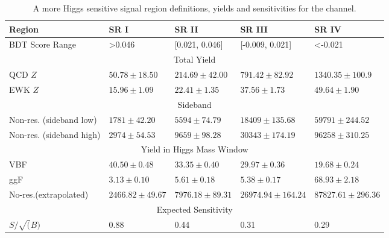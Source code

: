 \begin{table}[htbp]
\centering
\caption{A more Higgs sensitive signal region definitions, yields and sensitivities for the \twocentral channel. }
\label{tab:BDTReg2cen_sensitive}
\begin{tabular}{|l|l|l|l|l|}
\hline
Region                       & SR I                & SR II                      & SR III                      & SR IV                 \\ \hline
BDT Score Range              & \textgreater0.046   & [0.021, 0.046]             & [-0.009, 0.021]             & \textless-0.021       \\ \hline
\multicolumn{5}{|c|}{Total Yield}                                                                                                     \\ \hline
QCD $Z$                      & $50.78 \pm 18.50$   & $214.69 \pm 42.00$         & $791.42 \pm 82.92$          & $1340.35 \pm 100.9$   \\ \cline{2-5} 
EWK $Z$                      & $15.96 \pm 1.09$    & $22.41 \pm 1.35$         & $37.56 \pm 1.73$            & $49.64\pm 1.90$       \\ \hline
\multicolumn{5}{|c|}{Sideband}                                                                                                        \\ \hline
Non-res. (sideband low)  & $1781 \pm 42.20$    & $5594 \pm 74.79 $          & $18409 \pm 135.68$          & $59791 \pm 244.52$    \\ \cline{2-5} 
Non-res. (sideband high) & $2974 \pm 54.53$    & $9659 \pm 98.28 $          & $30343 \pm 174.19$          & $96258 \pm 310.25$    \\ \hline
\multicolumn{5}{|c|}{Yield in Higgs Mass Window}                                                                                      \\ \hline
VBF                          & $40.50 \pm 0.48$    & $33.35\pm 0.40$            & $29.97\pm 0.36$             & $19.68 \pm 0.24$      \\ \cline{2-5} 
ggF                          & $3.13 \pm 0.10$     & $5.61\pm 0.18$             & $5.38\pm 0.17$              & $68.93 \pm 2.18$      \\ \cline{2-5} 
No-res.(extrapolated)   & $2466.82 \pm 49.67$ & $7976.18 \pm 89.31$        & $26974.94\pm 164.24$        & $87827.61 \pm 296.36$ \\ \hline
\multicolumn{5}{|c|}{Expected Sensitivity}                                                                                            \\ \hline
$S/ \sqrt(B)$                & 0.88                & 0.44                       & 0.31                        & 0.29                  \\ \hline
\end{tabular}
\end{table} 


